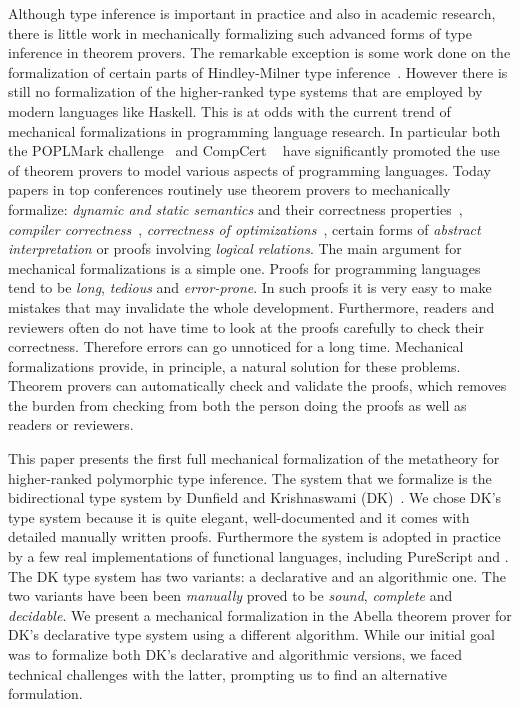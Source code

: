 Although type inference is important in practice and also in
academic research, there is little work in mechanically formalizing
such advanced forms of type inference in theorem provers.
The remarkable exception is some work done on the formalization of 
certain parts of Hindley-Milner type inference~\cite{naraschewski1999type,
dubois2000proving,dubois1999certification,urban2008nominal,
garrigue2015certified}. However
there is still no formalization of the higher-ranked type systems
that are employed by modern languages like Haskell.
This is at
odds with the current trend of mechanical formalizations in
programming language research. In particular both the POPLMark
challenge~\cite{aydemir2005mechanized} and
CompCert ~\cite{leroy2012compcert} have significantly promoted
the use of theorem provers to model various aspects of programming
languages. Today papers in top conferences routinely
use theorem provers to mechanically formalize: \emph{dynamic and
  static semantics} and their correctness properties~\cite{},
\emph{compiler correctness}~\cite{}, \emph{correctness of
  optimizations}~\cite{}, certain forms of \emph{abstract
  interpretation} or proofs involving \emph{logical relations}. The
main argument for mechanical formalizations is a simple one. Proofs
for programming languages tend to be \emph{long}, \emph{tedious} and
\emph{error-prone}. In such proofs it is very easy to make mistakes
that may invalidate the whole development. Furthermore, readers and
reviewers often do not have time to look at the proofs carefully to
check their correctness. Therefore errors can go unnoticed for a
long time.  Mechanical formalizations provide, in principle, a natural
solution for these problems. Theorem provers can automatically check and
validate the proofs, which removes the burden from checking from both
the person doing the proofs as well as readers or reviewers.

This paper presents the first full mechanical formalization of the
metatheory for higher-ranked polymorphic type inference.
The system
that we formalize is the bidirectional type system by Dunfield and
Krishnaswami (DK)~\cite{dunfield2013complete}.
We chose DK's type system because it is
quite elegant, well-documented and it comes with detailed manually
written proofs. Furthermore the system is adopted in practice by a few
real implementations of functional languages, including PureScript and
.  The DK type system has two variants: a declarative
and an algorithmic one. The two variants have been been
\emph{manually} proved to be \emph{sound}, \emph{complete} and
\emph{decidable}.
We present a mechanical formalization in the Abella theorem prover for
DK's declarative type system using a different algorithm. While our
initial goal was to formalize both DK's declarative and algorithmic
versions, we faced technical challenges with the latter, prompting us to find
an alternative formulation.

